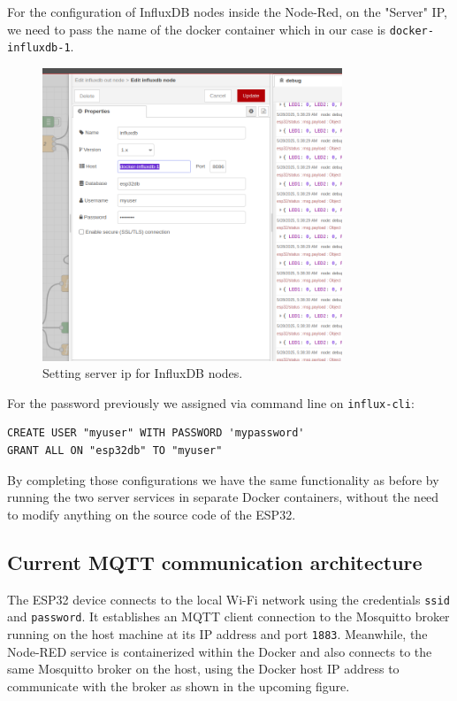 \documentclass[a4paper,12pt]{article}
\begin{document}
For the configuration of InfluxDB nodes inside the Node-Red, on the "Server" IP, we need to pass the name of the docker container 
which in our case is \texttt{docker-influxdb-1}.

		\begin{figure}[H]
			\centering
			\includegraphics[width=0.8\textwidth]{doc2.png}
			\caption{Setting server ip for InfluxDB nodes.}
			\label{fig1:}
		\end{figure}		

For the password previously we assigned via command line on \texttt{influx-cli}:

{\scriptsize
\begin{verbatim}
CREATE USER "myuser" WITH PASSWORD 'mypassword'
GRANT ALL ON "esp32db" TO "myuser"
\end{verbatim}
}
By completing those configurations we have the same functionality as before by running the two server services 
in separate Docker containers, without the need to modify anything on the source code of the ESP32.

\subsection{Current MQTT communication architecture}

The ESP32 device connects to the local Wi-Fi network using the 
credentials \texttt{ssid} and \texttt{password}. 
It establishes an MQTT client connection to the Mosquitto broker running on the host machine at its IP address and port \texttt{1883}. 
Meanwhile, the Node-RED service is containerized within the Docker 
and also connects to the same Mosquitto broker on the host, 
using the Docker host IP address to communicate with the broker as shown in the upcoming figure.
\end{document}
